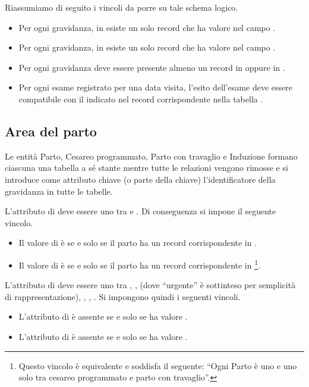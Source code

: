 Riassumiamo di seguito i vincoli da porre su tale schema logico.
\begin{itemize}
\item[\Con{}] Per ogni gravidanza, in  esiste un solo record che ha valore  nel campo .
\item[\Con{}] Per ogni gravidanza, in  esiste un solo record che ha valore  nel campo .
\item[\Con{}] Per ogni gravidanza deve essere presente almeno un record in  oppure in .
\item[\Con{}] Per ogni esame registrato per una data visita, l'esito dell'esame deve essere compatibile con il  indicato nel record corrispondente nella tabella .
\end{itemize}

\subsection{Area del parto}
\label{logicaldelivery}

Le entità Parto, Cesareo programmato, Parto con travaglio e Induzione formano ciascuna una tabella a sé stante mentre tutte le relazioni vengono rimosse e si introduce come attributo chiave (o parte della chiave) l'identificatore della gravidanza in tutte le tabelle.

L'attributo  di  deve essere uno tra  e .
Di conseguenza si impone il seguente vincolo.
\begin{itemize}
\item[\Con{}] Il valore di  è  se e solo se il parto ha un record corrispondente in .
\item[\Con{}] Il valore di  è  se e solo se il parto ha un record corrispondente in \footnote{
    Questo vincolo è equivalente e soddisfa il seguente: \enquote{Ogni Parto è uno e uno solo tra cesareo programmato e parto con travaglio}.
}.
\end{itemize}

L'attributo  di  deve essere uno tra , ,  (dove \enquote{urgente} è sottinteso per semplicità di rappresentazione), , , .
Si impongono quindi i seguenti vincoli.
\begin{itemize}
\item[\Con{}] L'attributo  di  è assente se e solo se  ha valore .
\item[\Con{}] L'attributo  di  è assente se e solo se  ha valore .
\end{itemize}

